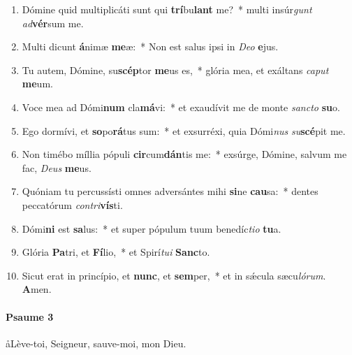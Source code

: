 \documentclass[twoside]{article}
\begin{document}
\begin{paracol}[1]{2}
\begin{enumerate}[wide, itemsep=0mm, labelwidth=!, labelindent=0pt, label=\color{gregoriocolor}\theenumi]
\item Dómine quid multiplicáti sunt qui \textbf{trí}bu\textbf{lant} me?~* multi insúr\textit{gunt} \textit{ad}\textbf{vér}sum me.
\item Multi dicunt \textbf{á}nimæ \textbf{me}æ:~* Non est salus ipsi in \textit{De}\textit{o} \textbf{e}jus.
\item Tu autem, Dómine, su\textbf{scép}tor \textbf{me}us es,~* glória mea, et exáltans \textit{ca}\textit{put} \textbf{me}um.
\item Voce mea ad Dómi\textbf{num} cla\textbf{má}vi:~* et exaudívit me de monte \textit{sanc}\textit{to} \textbf{su}o.
\item Ego dormívi, et \textbf{so}po\textbf{rá}tus sum:~* et exsurréxi, quia Dómi\textit{nus} \textit{su}\textbf{scé}pit me.
\item Non timébo míllia pópuli \textbf{cir}cum\textbf{dán}tis me:~* exsúrge, Dómine, salvum me fac, \textit{De}\textit{us} \textbf{me}us.
\item Quóniam tu percussísti omnes adversántes mihi \textbf{si}ne \textbf{cau}sa:~* dentes peccatórum \textit{con}\textit{tri}\textbf{vís}ti.
\item Dómi\textbf{ni} est \textbf{sa}lus:~* et super pópulum tuum benedíc\textit{ti}\textit{o} \textbf{tu}a.
\item Glória \textbf{Pa}tri, et \textbf{Fí}lio,~* et Spirí\textit{tu}\textit{i} \textbf{Sanc}to.
\item Sicut erat in princípio, et \textbf{nunc}, et \textbf{sem}per,~* et in sǽcula sæcu\textit{ló}\textit{rum}. \textbf{A}men.
\end{enumerate}

\switchcolumn

\paragraph{Psaume 3}
\aa Lève-toi, Seigneur, sauve-moi, mon Dieu.



\end{paracol}
\end{document}
